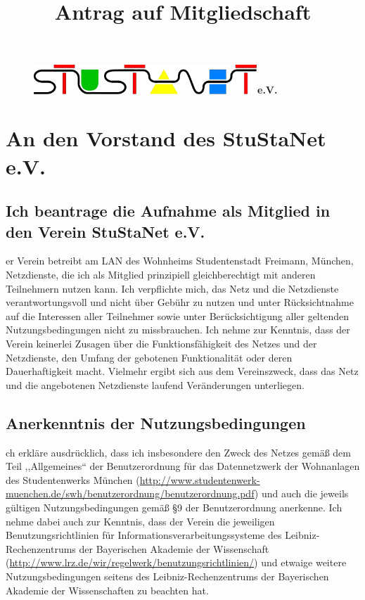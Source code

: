 \documentclass[a4paper,10pt]{scrartcl}
\title{Antrag auf Mitgliedschaft}
\date{}
\begin{document}

\maketitle
\vspace{-60pt}

\begin{figure}[t!]
   \centering
   \vspace{-40pt}
   \mbox{\includegraphics[width=0.75\textwidth,keepaspectratio]{stunetp}\Huge \sffamily \textbf{e.V.}}
   \vspace{-40pt}
\end{figure}


\section*{An den Vorstand des StuStaNet e.V.}

\subsection*{Ich beantrage die Aufnahme als Mitglied in den Verein StuStaNet e.V.}
er Verein betreibt am LAN des Wohnheims Studentenstadt Freimann, München, Netzdienste, die ich als Mitglied prinzipiell gleichberechtigt mit anderen Teilnehmern nutzen kann. Ich verpflichte mich, das Netz und die Netzdienste verantwortungsvoll und nicht über Gebühr zu nutzen und unter Rücksichtnahme auf die Interessen aller Teilnehmer sowie unter Berücksichtigung aller geltenden Nutzungsbedingungen nicht zu missbrauchen. Ich nehme zur Kenntnis, dass der Verein keinerlei Zusagen über die Funktionsfähigkeit des Netzes und der Netzdienste, den Umfang der gebotenen Funktionalität oder deren Dauerhaftigkeit macht. Vielmehr ergibt sich aus dem Vereinszweck, dass das Netz und die angebotenen Netzdienste laufend Veränderungen unterliegen.

\subsection*{Anerkenntnis der Nutzungsbedingungen}
ch erkläre ausdrücklich, dass ich insbesondere den Zweck des Netzes gemäß dem Teil ,,Allgemeines`` der Benutzerordnung für das Datennetzwerk der Wohnanlagen des Studentenwerks München (\url{http://www.studentenwerk-muenchen.de/swh/benutzerordnung/benutzerordnung.pdf}) und auch die jeweils gültigen Nutzungsbedingungen gemäß §9 der Benutzerordnung anerkenne. Ich nehme dabei auch zur Kenntnis, dass der Verein die jeweiligen Benutzungsrichtlinien für Informationsverarbeitungssysteme des Leibniz-Rechenzentrums der Bayerischen Akademie der Wissenschaft (\url{http://www.lrz.de/wir/regelwerk/benutzungsrichtlinien/}) und etwaige weitere Nutzungsbedingungen seitens des Leibniz-Rechenzentrums der Bayerischen Akademie der Wissenschaften zu beachten hat.
\end{document}
